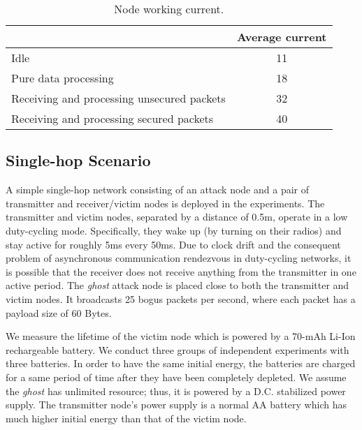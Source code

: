 \documentclass[10pt,journal,cspaper,compsoc]{IEEEtran}
\begin{document}
\renewcommand\arraystretch{1.35}
\begin{table}[ht]
\scriptsize
\caption{Node working current.}
\vspace{-4mm}
\center
\begin{tabular}{>{\centering\arraybackslash}m{5.2cm}|c}
\toprule
{\bf Working mode} & {\bf Average current}\\
\hline
Idle & 11\\
Pure data processing  & 18\\
Receiving and processing unsecured packets & 32\\
Receiving and processing secured packets & 40\\
\bottomrule
\end{tabular}\label{workingcurrent}
\end{table}


\subsection{Single-hop Scenario}
A simple single-hop network consisting of an attack node and a pair of transmitter and receiver/victim nodes is deployed in the experiments. The transmitter and victim nodes, separated by a distance of 0.5m, operate in a low duty-cycling mode. Specifically, they wake up (by turning on their radios) and stay active for roughly 5ms every 50ms. Due to clock drift and the consequent problem of asynchronous communication rendezvous in duty-cycling networks, it is possible that the receiver does not receive anything from the transmitter in one active period. The {\em ghost} attack node is placed close to both the transmitter and victim nodes. It broadcasts 25 bogus packets per second, where each packet has a payload size of 60 Bytes.

We measure the lifetime of the victim node which is powered by a 70-mAh Li-Ion rechargeable battery. We conduct three groups of independent experiments with three batteries. In order to have the same initial energy, the batteries are charged for a same period of time after they have been completely depleted. We assume the {\em ghost} has unlimited resource; thus, it is powered by a D.C. stabilized power supply. The transmitter node's power supply is a normal AA battery which has much higher initial energy than that of the victim node.
\end{document}
